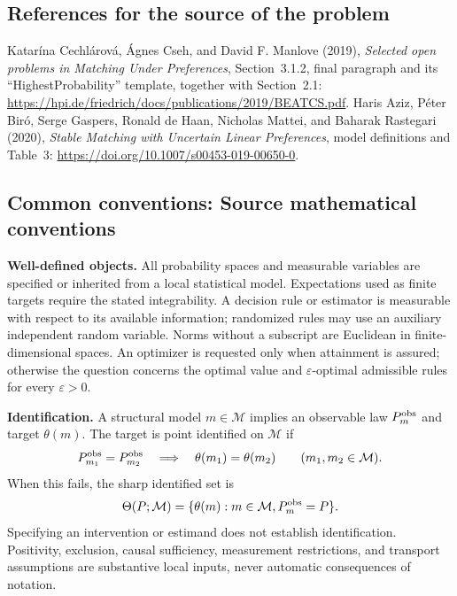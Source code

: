 \documentclass[11pt,a4paper]{article}
\begin{document}
\subsection*{References for the source of the problem}
Katar\'ina Cechl\'arov\'a, \'Agnes Cseh, and David F. Manlove (2019), \emph{Selected open problems in Matching Under Preferences}, Section~3.1.2, final paragraph and its ``HighestProbability'' template, together with Section~2.1: \url{https://hpi.de/friedrich/docs/publications/2019/BEATCS.pdf}. Haris Aziz, P\'eter Bir\'o, Serge Gaspers, Ronald de Haan, Nicholas Mattei, and Baharak Rastegari (2020), \emph{Stable Matching with Uncertain Linear Preferences}, model definitions and Table~3: \url{https://doi.org/10.1007/s00453-019-00650-0}.

\subsection*{Common conventions: Source mathematical conventions}

\textbf{Well-defined objects.}
All probability spaces and measurable variables are specified or inherited
from a local statistical model. Expectations used as finite targets require
the stated integrability. A decision rule or estimator is measurable with
respect to its available information; randomized rules may use an auxiliary
independent random variable. Norms without a subscript are Euclidean in
finite-dimensional spaces. An optimizer is requested only when attainment
is assured; otherwise the question concerns the optimal value and
$\varepsilon$-optimal admissible rules for every $\varepsilon>0$.

\textbf{Identification.}
A structural model $m\in\mathcal M$ implies an observable law
$P_m^{\rm obs}$ and target $\theta(m)$. The target is point identified on
$\mathcal M$ if
\[
 P_{m_1}^{\rm obs}=P_{m_2}^{\rm obs}
 \quad\Longrightarrow\quad\theta(m_1)=\theta(m_2)
 \qquad(m_1,m_2\in\mathcal M).
\]
When this fails, the sharp identified set is
\[
 \Theta(P;\mathcal M)=\{\theta(m):m\in\mathcal M,
                                  P_m^{\rm obs}=P\}.
\]
Specifying an intervention or estimand does not establish identification.
Positivity, exclusion, causal sufficiency, measurement restrictions, and
transport assumptions are substantive local inputs, never automatic
consequences of notation.
\end{document}
